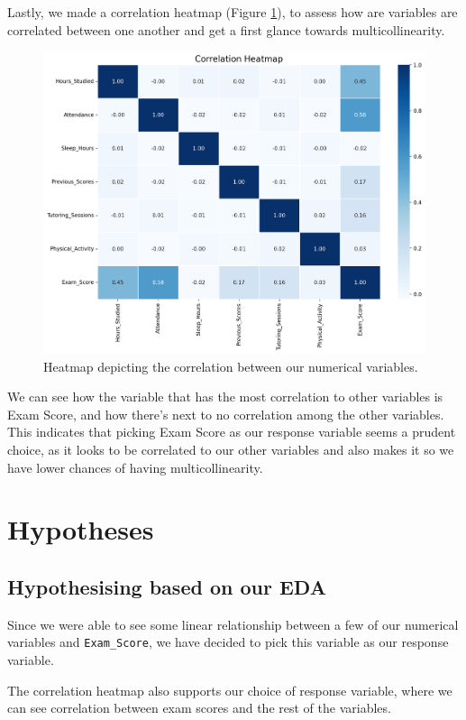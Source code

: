 \documentclass[twocolumn]{article} %
\begin{document}
Lastly, we made a correlation heatmap (Figure \ref{4:corr-heatmap}), to assess how are variables are correlated between one another and get a first glance towards multicollinearity.

\begin{figure}[h]
  \centering
  \includegraphics[width=0.9\linewidth]{4-correlation-heatmap.png}
  \caption{Heatmap depicting the correlation between our numerical variables.}
  \label{4:corr-heatmap}
\end{figure}

We can see how the variable that has the most correlation to other variables is Exam Score, and how there's next to no correlation among the other variables. This indicates that picking Exam Score as our response variable seems a prudent choice, as it looks to be correlated to our other variables and also makes it so we have lower chances of having multicollinearity.

\newpage
\section{Hypotheses}

\subsection*{Hypothesising based on our EDA}
Since we were able to see some linear relationship between a few of our numerical variables and \texttt{Exam\_Score}, we have decided to pick this variable as our response variable.

The correlation heatmap also supports our choice of response variable, where we can see correlation between exam scores and the rest of the variables.
\end{document}
